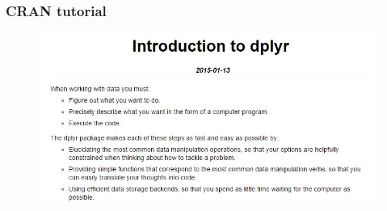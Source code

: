 \documentclass{beamer}
\begin{document}
	\begin{frame}
		\frametitle{CRAN tutorial}
\begin{figure}
\centering
\includegraphics[width=1.15\linewidth]{images/introdplyr}

\end{figure}

		
	\end{frame}
	
\end{document}
